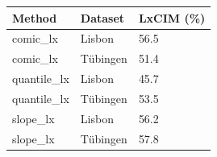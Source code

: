 \begin{tabular}{lll}
\toprule
Method & Dataset & LxCIM (\%) \\
\midrule
comic\_lx & Lisbon & 56.5 \\
comic\_lx & Tübingen & 51.4 \\
quantile\_lx & Lisbon & 45.7 \\
quantile\_lx & Tübingen & 53.5 \\
slope\_lx & Lisbon & 56.2 \\
slope\_lx & Tübingen & 57.8 \\
\bottomrule
\end{tabular}
